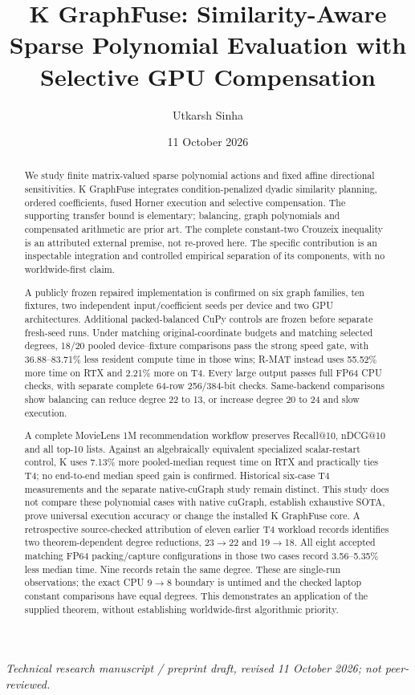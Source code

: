 \documentclass[10pt]{article}
\title{K GraphFuse: Similarity-Aware Sparse Polynomial Evaluation with Selective GPU Compensation}
\author{Utkarsh Sinha}
\date{11 October 2026}
\begin{document}
\maketitle
\begin{center}
\emph{Technical research manuscript / preprint draft, revised 11 October 2026; not peer-reviewed.}
\end{center}

\begin{abstract}
We study finite matrix-valued sparse polynomial actions and fixed affine directional sensitivities. K GraphFuse integrates condition-penalized dyadic similarity planning, ordered coefficients, fused Horner execution and selective compensation. The supporting transfer bound is elementary; balancing, graph polynomials and compensated arithmetic are prior art. The complete constant-two Crouzeix inequality is an attributed external premise, not re-proved here. The specific contribution is an inspectable integration and controlled empirical separation of its components, with no worldwide-first claim.

A publicly frozen repaired implementation is confirmed on six graph families, ten fixtures, two independent input/coefficient seeds per device and two GPU architectures. Additional packed-balanced CuPy controls are frozen before separate fresh-seed runs. Under matching original-coordinate budgets and matching selected degrees, 18/20 pooled device--fixture comparisons pass the strong speed gate, with 36.88--83.71\% less resident compute time in those wins; R-MAT instead uses 55.52\% more time on RTX and 2.21\% more on T4. Every large output passes full FP64 CPU checks, with separate complete 64-row 256/384-bit checks. Same-backend comparisons show balancing can reduce degree 22 to 13, or increase degree 20 to 24 and slow execution.

A complete MovieLens 1M recommendation workflow preserves Recall@10, nDCG@10 and all top-10 lists. Against an algebraically equivalent specialized scalar-restart control, K uses 7.13\% more pooled-median request time on RTX and practically ties T4; no end-to-end median speed gain is confirmed. Historical six-case T4 measurements and the separate native-cuGraph study remain distinct. This study does not compare these polynomial cases with native cuGraph, establish exhaustive SOTA, prove universal execution accuracy or change the installed K GraphFuse core.
A retrospective source-checked attribution of eleven earlier T4 workload records identifies two theorem-dependent degree reductions, 23$\to$22 and 19$\to$18. All eight accepted matching FP64 packing/capture configurations in those two cases record 3.56--5.35\% less median time. Nine records retain the same degree. These are single-run observations; the exact CPU 9$\to$8 boundary is untimed and the checked laptop constant comparisons have equal degrees. This demonstrates an application of the supplied theorem, without establishing worldwide-first algorithmic priority.
\end{abstract}
\end{document}

